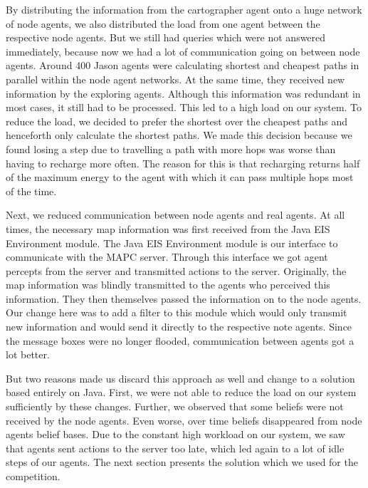 By distributing the information from the cartographer agent onto a huge network of node agents, we also distributed the load from one agent between the respective node agents.
But we still had queries which were not answered immediately, because now we had a lot of communication going on between node agents.
Around 400 Jason agents were calculating shortest and cheapest paths in parallel within the node agent networks.
At the same time, they received new information by the exploring agents.
Although this information was redundant in most cases, it still had to be processed.
This led to a high load on our system.
To reduce the load, we decided to prefer the shortest over the cheapest paths and henceforth only calculate the shortest paths.
We made this decision because we found losing a step due to travelling a path with more hops was worse than having to recharge more often.
The reason for this is that recharging returns half of the maximum energy to the agent with which it can pass multiple hops most of the time.

Next, we reduced communication between node agents and real agents.
At all times, the necessary map information was first received from the Java EIS Environment module.
The Java EIS Environment module is our interface to communicate with the MAPC server.
Through this interface we got agent percepts from the server and transmitted actions to the server.
Originally, the map information was blindly transmitted to the agents who perceived this information.
They then themselves passed the information on to the node agents.
Our change here was to add a filter to this module which would only transmit new information and would send it directly to the respective note agents.
Since the message boxes were no longer flooded, communication between agents got a lot better.

But two reasons made us discard this approach as well and change to a solution based entirely on Java.
First, we were not able to reduce the load on our system sufficiently by these changes.
Further, we observed that some beliefs were not received by the node agents.
Even worse, over time beliefs disappeared from node agents belief bases.
Due to the constant high workload on our system, we saw that agents sent actions to the server too late, which led again to a lot of idle steps of our agents.
The next section presents the solution which we used for the competition.

